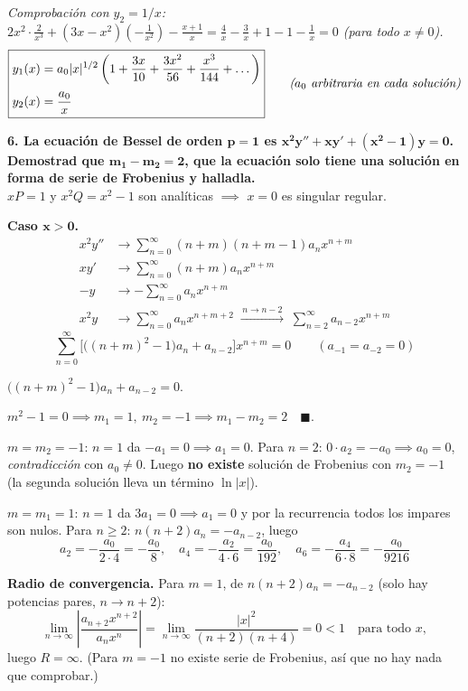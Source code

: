 \documentclass[11pt, a4paper]{article}
\begin{document}
\textit{Comprobación con $y_2=1/x$: $2x^2\cdot\frac{2}{x^3}+(3x-x^2)\left(-\frac1{x^2}\right)-\frac{x+1}{x}=\frac4x-\frac3x+1-1-\frac1x=0$ \checkmark (para todo $x\neq0$).}
\[
\boxed{\begin{aligned}y_1(x)&=a_0|x|^{1/2}\left(1+\frac{3x}{10}+\frac{3x^2}{56}+\frac{x^3}{144}+\dots\right) \\[2pt] y_2(x)&=\frac{a_0}{x}\end{aligned}} \qquad \text{\textit{($a_0$ arbitraria en cada solución)}}
\]


\noindent\textbf{6. La ecuación de Bessel de orden $\bm{p=1}$ es $\bm{x^2y''+xy'+(x^2-1)y=0}$. Demostrad que $\bm{m_1-m_2=2}$, que la ecuación solo tiene una solución en forma de serie de Frobenius y halladla.} \\
$xP=1$ y $x^2Q=x^2-1$ son analíticas $\implies$ $x=0$ es singular regular.

\vspace{0.2cm}\noindent\textbf{Caso $\bm{x>0}$.}
\begin{align*}
x^2y'' &\to \sum_{n=0}^\infty (n+m)(n+m-1)a_nx^{n+m} \\
xy' &\to \sum_{n=0}^\infty (n+m)a_nx^{n+m} \\
-y &\to -\sum_{n=0}^\infty a_nx^{n+m} \\
x^2y &\to \sum_{n=0}^\infty a_nx^{n+m+2} \;\xrightarrow{\,n\to n-2\,}\; \sum_{n=2}^\infty a_{n-2}x^{n+m}
\end{align*}
\[
\sum_{n=0}^\infty\Big[\big((n+m)^2-1\big)a_n+a_{n-2}\Big]x^{n+m}=0 \qquad (a_{-1}=a_{-2}=0)
\]

\smallskip\noindent $\big((n+m)^2-1\big)a_n+a_{n-2}=0$.

\smallskip\noindent $m^2-1=0 \implies m_1=1,\ m_2=-1 \implies m_1-m_2=2 \quad\blacksquare$.


\smallskip\noindent $m=m_2=-1$: $n=1$ da $-a_1=0\implies a_1=0$. Para $n=2$: $0\cdot a_2=-a_0\implies a_0=0$, \emph{contradicción} con $a_0\neq0$. Luego \textbf{no existe} solución de Frobenius con $m_2=-1$ (la segunda solución lleva un término $\ln|x|$).

\smallskip\noindent $m=m_1=1$: $n=1$ da $3a_1=0\implies a_1=0$ y por la recurrencia todos los impares son nulos. Para $n\geq2$: $n(n+2)a_n=-a_{n-2}$, luego
\[
a_2=-\frac{a_0}{2\cdot4}=-\frac{a_0}{8},\quad a_4=-\frac{a_2}{4\cdot6}=\frac{a_0}{192},\quad a_6=-\frac{a_4}{6\cdot8}=-\frac{a_0}{9216}
\]

\smallskip\noindent\textbf{Radio de convergencia.} Para $m=1$, de $n(n+2)a_n=-a_{n-2}$ (solo hay potencias pares, $n\to n+2$):
\[
\lim_{n\to\infty}\left|\frac{a_{n+2}x^{n+2}}{a_nx^n}\right|=\lim_{n\to\infty}\frac{|x|^2}{(n+2)(n+4)}=0<1 \quad\text{para todo }x,
\]
luego $R=\infty$. (Para $m=-1$ no existe serie de Frobenius, así que no hay nada que comprobar.)
\end{document}
